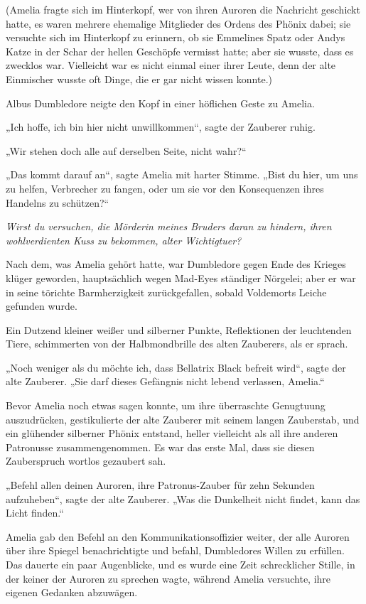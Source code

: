 {(Amelia fragte sich im Hinterkopf, wer von ihren Auroren die Nachricht geschickt hatte, es waren mehrere ehemalige Mitglieder des Ordens des Phönix dabei; sie versuchte sich im Hinterkopf zu erinnern, ob sie Emmelines Spatz oder Andys Katze in der Schar der hellen Geschöpfe vermisst hatte; aber sie wusste, dass es zwecklos war. Vielleicht war es nicht einmal einer ihrer Leute, denn der alte Einmischer wusste oft Dinge, die er gar nicht wissen konnte.)

Albus Dumbledore neigte den Kopf in einer höflichen Geste zu Amelia.

„Ich hoffe, ich bin hier nicht unwillkommen“, sagte der Zauberer ruhig.

„Wir stehen doch alle auf derselben Seite, nicht wahr?“

„Das kommt darauf an“, sagte Amelia mit harter Stimme. „Bist du hier, um uns zu helfen, Verbrecher zu fangen, oder um sie vor den Konsequenzen ihres Handelns zu schützen?“

\emph{Wirst du versuchen, die Mörderin meines Bruders daran zu hindern, ihren wohlverdienten Kuss zu bekommen, alter Wichtigtuer?}

Nach dem, was Amelia gehört hatte, war Dumbledore gegen Ende des Krieges klüger geworden, hauptsächlich wegen Mad-Eyes ständiger Nörgelei; aber er war in seine törichte Barmherzigkeit zurückgefallen, sobald Voldemorts Leiche gefunden wurde.

Ein Dutzend kleiner weißer und silberner Punkte, Reflektionen der leuchtenden Tiere, schimmerten von der Halbmondbrille des alten Zauberers, als er sprach.

„Noch weniger als du möchte ich, dass Bellatrix Black befreit wird“, sagte der alte Zauberer. „Sie darf dieses Gefängnis nicht lebend verlassen, Amelia.“

Bevor Amelia noch etwas sagen konnte, um ihre überraschte Genugtuung auszudrücken, gestikulierte der alte Zauberer mit seinem langen Zauberstab, und ein glühender silberner Phönix entstand, heller vielleicht als all ihre anderen Patronusse zusammengenommen. Es war das erste Mal, dass sie diesen Zauberspruch wortlos gezaubert sah.

„Befehl allen deinen Auroren, ihre Patronus-Zauber für zehn Sekunden aufzuheben“, sagte der alte Zauberer. „Was die Dunkelheit nicht findet, kann das Licht finden.“

Amelia gab den Befehl an den Kommunikationsoffizier weiter, der alle Auroren über ihre Spiegel benachrichtigte und befahl, Dumbledores Willen zu erfüllen. Das dauerte ein paar Augenblicke, und es wurde eine Zeit schrecklicher Stille, in der keiner der Auroren zu sprechen wagte, während Amelia versuchte, ihre eigenen Gedanken abzuwägen.

}
